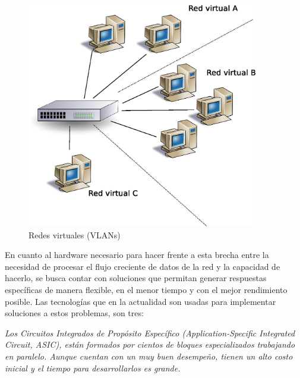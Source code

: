 \begin{figure}[h]
  \centering
	\includegraphics[width=0.90\textwidth]{1-introduccion/graf/vlan.eps}
  \caption{Redes virtuales (VLANs)}
  \label{fig:virt}
\end{figure}




En cuanto al hardware necesario para hacer frente a esta brecha entre la necesidad de procesar el flujo creciente de datos de la red y la capacidad de hacerlo, se busca contar con soluciones que permitan generar respuestas específicas de manera flexible, en el menor tiempo y con el mejor rendimiento posible. Las tecnologías que en la actualidad son usadas para implementar soluciones a estos problemas, son tres:

\emph{Los Circuitos Integrados de Propósito Específico (\textit{Application-Specific Integrated Circuit}, ASIC), están formados por cientos de bloques especializados trabajando en paralelo. Aunque cuentan con un muy buen desempeño, tienen un alto costo inicial y el tiempo para desarrollarlos es grande.}

